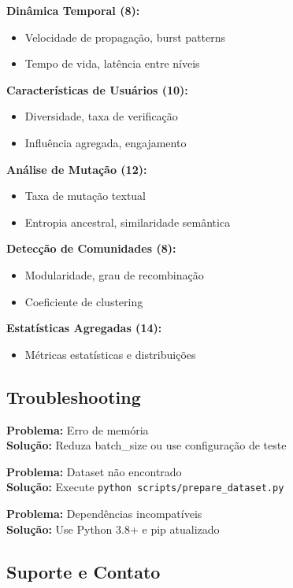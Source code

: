 \documentclass[12pt]{article}
\begin{document}
\textbf{Din\^amica Temporal (8):}
\begin{itemize}
    \item Velocidade de propaga\c{c}\~ao, burst patterns
    \item Tempo de vida, lat\^encia entre n\'iveis
\end{itemize}

\textbf{Caracter\'isticas de Usu\'arios (10):}
\begin{itemize}
    \item Diversidade, taxa de verifica\c{c}\~ao
    \item Influ\^encia agregada, engajamento
\end{itemize}

\textbf{An\'alise de Muta\c{c}\~ao (12):}
\begin{itemize}
    \item Taxa de muta\c{c}\~ao textual
    \item Entropia ancestral, similaridade sem\^antica
\end{itemize}

\textbf{Detec\c{c}\~ao de Comunidades (8):}
\begin{itemize}
    \item Modularidade, grau de recombina\c{c}\~ao
    \item Coeficiente de clustering
\end{itemize}

\textbf{Estat\'isticas Agregadas (14):}
\begin{itemize}
    \item M\'etricas estat\'isticas e distribui\c{c}\~oes
\end{itemize}

\subsection{Troubleshooting}

\textbf{Problema:} Erro de mem\'oria\\
\textbf{Solu\c{c}\~ao:} Reduza batch\_size ou use configura\c{c}\~ao de teste

\textbf{Problema:} Dataset n\~ao encontrado\\
\textbf{Solu\c{c}\~ao:} Execute \texttt{python scripts/prepare\_dataset.py}

\textbf{Problema:} Depend\^encias incompat\'iveis\\
\textbf{Solu\c{c}\~ao:} Use Python 3.8+ e pip atualizado

\subsection{Suporte e Contato}
\end{document}
